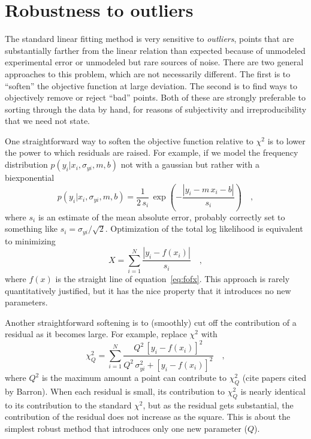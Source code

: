 \documentclass[12pt]{article}
\newcommand{\equationname}{equation}
\newcounter{problem}
\begin{document}
\section{Robustness to outliers}\label{sec:robust}

The standard linear fitting method is very sensitive to
\emph{outliers}, points that are substantially farther from the linear
relation than expected because of unmodeled experimental error or
unmodeled but rare sources of noise.  There are two general approaches
to this problem, which are not necessarily different.  The first is to
``soften'' the objective function at large deviation.  The second is
to find ways to objectively remove or reject ``bad'' points.  Both of
these are strongly preferable to sorting through the data by hand, for
reasons of subjectivity and irreproducibility that we need not state.

One straightforward way to soften the objective function relative to
$\chi^2$ is to lower the power to which residuals are raised.  For
example, if we model the frequency distribution
$p(y_i|x_i,\sigma_{yi},m,b)$ not with a gaussian but rather with a
biexponential
\begin{equation}
p(y_i|x_i,\sigma_{yi},m,b) = \frac{1}{2\,s_i}
 \,\exp\left(-\frac{|y_i-m\,x_i-b|}{s_i}\right) \quad ,
\end{equation}
where $s_i$ is an estimate of the mean absolute error, probably
correctly set to something like $s_i = \sigma_{yi}/\sqrt{2}$.
Optimization of the total log likelihood is equivalent to minimizing
\begin{equation}\label{eq:biexp}
X = \sum_{i=1}^N \frac{|y_i-f(x_i)|}{s_i} \quad ,
\end{equation}
where $f(x)$ is the straight line of \equationname~\ref{eq:fofx}.
This approach is rarely quantitatively justified, but it has the nice
property that it introduces no new parameters.

Another straightforward softening is to (smoothly) cut off the
contribution of a residual as it becomes large.  For example, replace
$\chi^2$ with
\begin{equation}\label{eq:soft}
\chi_Q^2 = \sum_{i=1}^N \frac{Q^2\,[y_i-f(x_i)]^2}
  {Q^2\,\sigma_{yi}^2+[y_i-f(x_i)]^2} \quad ,
\end{equation}
where $Q^2$ is the maximum amount a point can contribute to $\chi_Q^2$
(cite papers cited by Barron).  When each residual is small, its
contribution to $\chi_Q^2$ is nearly identical to its contribution to
the standard $\chi^2$, but as the residual gets substantial, the
contribution of the residual does not increase as the square.  This is
about the simplest robust method that introduces only one new
parameter ($Q$).
\end{document}
